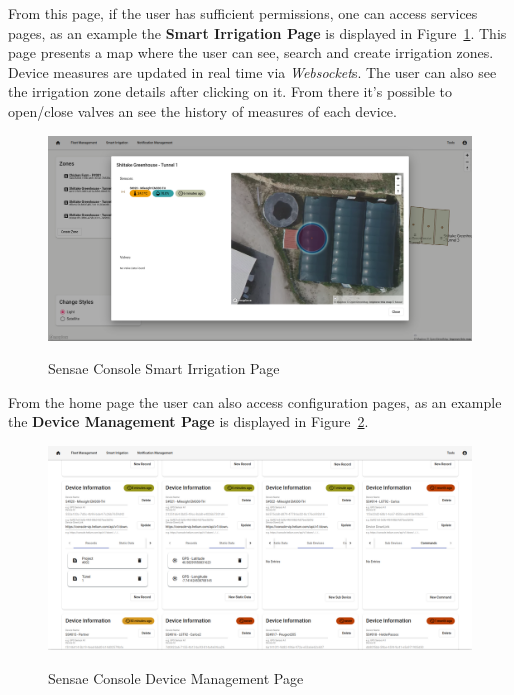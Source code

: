 From this page, if the user has sufficient permissions, one can access services pages, as an example the \textbf{Smart Irrigation Page} is displayed in Figure~\ref{fig:implementation:description:ui:smartirrigation}.
This page presents a map where the user can see, search and create irrigation zones. Device measures are updated in real time via \textit{Websocket}s. The user can also see the irrigation zone details after clicking on it. From there it's possible to open/close valves an see the history of measures of each device. 

\begin{figure}[H]
    \centering
    \resizebox{\columnwidth}{!}
    {
       \includegraphics{assets/figures/ui/smart-irrigation.png}
    }
    \caption[Sensae Console Smart Irrigation Page]{Sensae Console Smart Irrigation Page}
    \label{fig:implementation:description:ui:smartirrigation}
\end{figure}

From the home page the user can also access configuration pages, as an example the \textbf{Device Management Page} is displayed in Figure~\ref{fig:implementation:description:ui:device}.

\begin{figure}[H]
    \centering
    \resizebox{\columnwidth}{!}
    {
       \includegraphics{assets/figures/ui/device-management.png}
    }
    \caption[Sensae Console Device Management Page]{Sensae Console Device Management Page}
    \label{fig:implementation:description:ui:device}
\end{figure}

